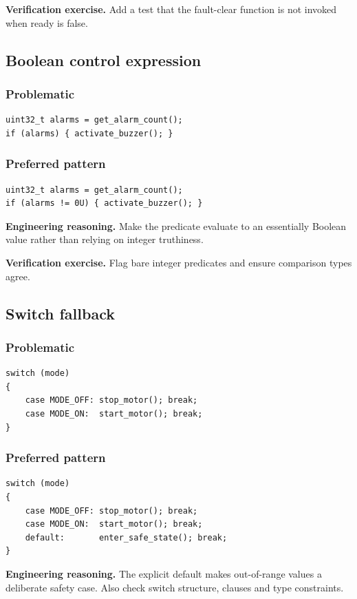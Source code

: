 \documentclass[10pt,letterpaper]{article}
\begin{document}
\textbf{Verification exercise.} Add a test that the fault-clear function is not invoked when ready is false.

\subsection{Boolean control expression}
\subsubsection*{Problematic}
\begin{lstlisting}[style=engineerc]
uint32_t alarms = get_alarm_count();
if (alarms) { activate_buzzer(); }
\end{lstlisting}
\subsubsection*{Preferred pattern}
\begin{lstlisting}[style=engineerc]
uint32_t alarms = get_alarm_count();
if (alarms != 0U) { activate_buzzer(); }
\end{lstlisting}
\textbf{Engineering reasoning.} Make the predicate evaluate to an essentially Boolean value rather than relying on integer truthiness.

\textbf{Verification exercise.} Flag bare integer predicates and ensure comparison types agree.

\subsection{Switch fallback}
\subsubsection*{Problematic}
\begin{lstlisting}[style=engineerc]
switch (mode)
{
    case MODE_OFF: stop_motor(); break;
    case MODE_ON:  start_motor(); break;
}
\end{lstlisting}
\subsubsection*{Preferred pattern}
\begin{lstlisting}[style=engineerc]
switch (mode)
{
    case MODE_OFF: stop_motor(); break;
    case MODE_ON:  start_motor(); break;
    default:       enter_safe_state(); break;
}
\end{lstlisting}
\textbf{Engineering reasoning.} The explicit default makes out-of-range values a deliberate safety case. Also check switch structure, clauses and type constraints.
\end{document}
